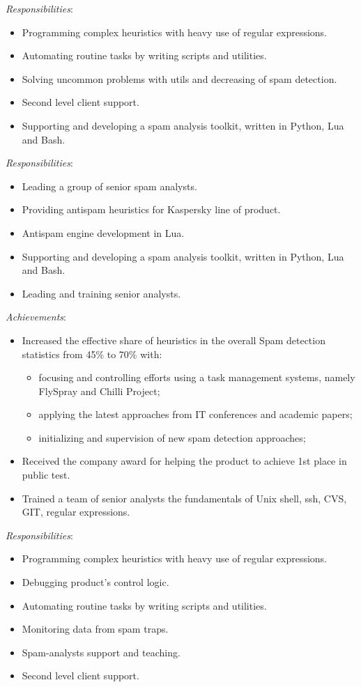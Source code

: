 \documentclass[11pt,a4paper,sans]{moderncv}        %
\newcommand{\responsibilities}[1]{ \emph{Responsibilities}:\begin{itemize} #1\end{itemize}}
\newcommand{\achievements}[1]{ \emph{Achievements}:\begin{itemize} #1\end{itemize}}
\begin{document}
 {
    \responsibilities {
        \item Programming complex heuristics with heavy use of regular expressions.
        \item Automating routine tasks by writing scripts and utilities.
        \item Solving uncommon problems with utils and decreasing of spam detection.
        \item Second level client support.
	\item Supporting and developing a spam analysis toolkit, written in Python, Lua and Bash.
    }
}
\pagebreak
{} {
    \responsibilities {
        \item Leading a group of senior spam analysts.
        \item Providing antispam heuristics for Kaspersky line of product.
        \item Antispam engine development in Lua.
        \item Supporting and developing a spam analysis toolkit, written in Python, Lua and Bash.
	\item Leading and training senior analysts.
    }
    \achievements {
        \item Increased the effective share of heuristics in the overall Spam detection statistics from 45\% to 70\% with:
        \begin{itemize}
            \item focusing and controlling efforts using a task management systems, namely FlySpray and Chilli Project;
            \item applying the latest approaches from IT conferences and academic papers;
            \item initializing and supervision of new spam detection approaches;
        \end{itemize}
	\item Received the company award for helping the product to achieve 1st place in public test.
        \item Trained a team of senior analysts the fundamentals of Unix shell, ssh, CVS, GIT, regular expressions.
    }
}

 {
    \responsibilities {
        \item Programming complex heuristics with heavy use of regular expressions.
        \item Debugging product's control logic.
        \item Automating routine tasks by writing scripts and utilities.
        \item Monitoring data from spam traps.
        \item Spam-analysts support and teaching.
        \item Second level client support.
    }
}
\end{document}

